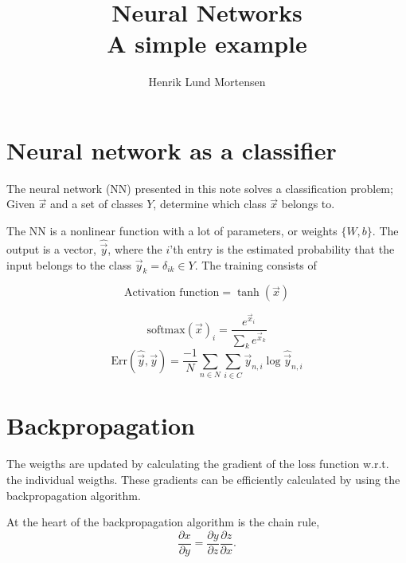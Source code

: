 \documentclass[oneside]{memoir}
\title{Neural Networks \\ \small{A simple example}}
\author{Henrik Lund Mortensen}
\begin{document}
\maketitle


\section{Neural network as a classifier}
The neural network (NN) presented in this note solves a classification problem; Given $\vec{x}$ and a set of classes $Y$, determine which class $\vec{x}$ belongs to. 

The NN is a nonlinear function with a lot of parameters, or weights $\{W,b\}$. The output is a vector, $\hat{\vec{y}}$, where the $i$'th entry is the estimated probability that the input belongs to the class $\vec{y}_{k} = \delta_{ik} \in Y$. The training consists of




\begin{equation}
  \label{activation function tanh}
\text{Activation function} = \tanh(\vec{x})
\end{equation}

\begin{equation}
  \label{softmax}
  \text{softmax}(\vec{x})_i = \frac{e^{\vec{x}_i}}{\sum_k e^{\vec{x}_k}}
\end{equation}
\begin{equation}
  \label{cross entropy}
  \text{Err}(\hat{\vec{y}},\vec{y}) = \frac{-1}{N} \sum_{n\in N} \sum_{i \in C} \vec{y}_{n,i} \log \hat{\vec{y}}_{n,i}
\end{equation}

\section{Backpropagation} 
The weigths are updated by calculating the gradient of the loss function w.r.t. the individual weigths. These gradients can be efficiently calculated by using the backpropagation algorithm.

At the heart of the backpropagation algorithm is the chain rule,
\begin{equation}
  \label{chain rule}
  \frac{\partial x}{\partial y} = \frac{\partial y}{\partial z} \frac{\partial z}{\partial x}.
\end{equation}
\end{document}
